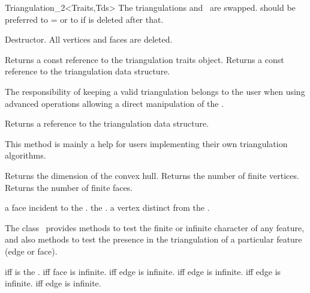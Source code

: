 \begin{ccRefClass}{Triangulation_2<Traits,Tds>}
{The triangulations  and \ccVar\ are swapped.
 should be preferred to  =  or to
 if  is deleted after that.}


{Destructor. All vertices and faces are deleted.}


\ccAccessFunctions
{}
{Returns a const reference to the triangulation traits object.}
\ccGlue
{}
{Returns a const reference to the triangulation data structure.}

\begin{ccAdvanced}
The responsibility of keeping a valid triangulation belongs to the user
when using advanced operations allowing a direct manipulation of the .

{Returns a reference to the triangulation data structure.}

This method is mainly a help for users implementing their own triangulation
algorithms.
 
\end{ccAdvanced}


\ccGlue
{}
{Returns the dimension of the convex hull.}
\ccGlue
{}
{Returns the number of finite vertices.}
\ccGlue
{}
{Returns the number of finite faces.}

{a  face incident to the .}
\ccGlue
{}
{the .}
\ccGlue
{}
{a vertex distinct from  the .}


\ccPredicates
The class \ccRefName\ provides methods to test
the finite or infinite character of any feature,
and also methods to test the presence in the triangulation
of a particular feature (edge or face).

{ iff  is the .}
\ccGlue
{}
{ iff face  is infinite.}
\ccGlue
{}
{ iff edge  is infinite.}
\ccGlue
{}
{ iff edge  is infinite.}
\ccGlue
{}
{ iff edge  is infinite.}
\ccGlue
{}
{ iff edge  is infinite.}



\end{ccRefClass}
